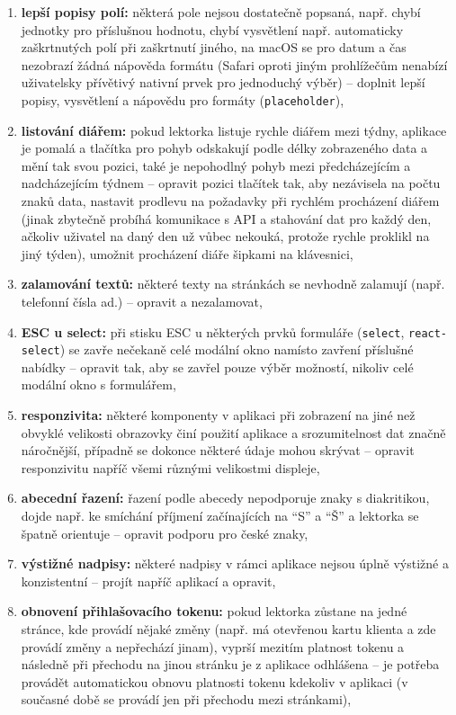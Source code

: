 \begin{enumerate}[label=\textbf{P\arabic*}]
    \item \label{P12} \textbf{lepší popisy polí:} některá pole nejsou dostatečně popsaná, např. chybí jednotky pro příslušnou hodnotu, chybí vysvětlení např. automaticky zaškrtnutých polí při zaškrtnutí jiného, na macOS se pro datum a čas nezobrazí žádná nápověda formátu (Safari oproti jiným prohlížečům nenabízí uživatelsky přívětivý nativní prvek pro jednoduchý výběr) -- doplnit lepší popisy, vysvětlení a nápovědu pro formáty (\verb|placeholder|),
    \item \label{P13} \textbf{listování diářem:} pokud lektorka listuje rychle diářem mezi týdny, aplikace je pomalá a tlačítka pro pohyb odskakují podle délky zobrazeného data a mění tak svou pozici, také je nepohodlný pohyb mezi předcházejícím a nadcházejícím týdnem -- opravit pozici tlačítek tak, aby nezávisela na počtu znaků data, nastavit prodlevu na požadavky při rychlém procházení diářem (jinak zbytečně probíhá komunikace s API a stahování dat pro každý den, ačkoliv uživatel na daný den už vůbec nekouká, protože rychle proklikl na jiný týden), umožnit procházení diáře šipkami na klávesnici,
    \item \label{P14} \textbf{zalamování textů:} některé texty na stránkách se nevhodně zalamují (např. telefonní čísla ad.) -- opravit a nezalamovat,
    \item \label{P15} \textbf{ESC u select:} při stisku ESC u některých prvků formuláře (\verb|select|, \verb|react-select|) se zavře nečekaně celé modální okno namísto zavření příslušné nabídky -- opravit tak, aby se zavřel pouze výběr možností, nikoliv celé modální okno s formulářem,
    \item \label{P16} \textbf{responzivita:} některé komponenty v aplikaci při zobrazení na jiné než obvyklé velikosti obrazovky činí použití aplikace a srozumitelnost dat značně náročnější, případně se dokonce některé údaje mohou skrývat -- opravit responzivitu napříč všemi různými velikostmi displeje,
    \item \label{P17} \textbf{abecední řazení:} řazení podle abecedy nepodporuje znaky s diakritikou, dojde např. ke smíchání příjmení začínajících na \enquote{S} a \enquote{Š} a lektorka se špatně orientuje -- opravit podporu pro české znaky,
    \item \label{P18} \textbf{výstižné nadpisy:} některé nadpisy v rámci aplikace nejsou úplně výstižné a konzistentní -- projít napříč aplikací a opravit,
    \item \label{P19} \textbf{obnovení přihlašovacího tokenu:} pokud lektorka zůstane na jedné stránce, kde provádí nějaké změny (např. má otevřenou kartu klienta a zde provádí změny a nepřechází jinam), vyprší mezitím platnost tokenu a následně při přechodu na jinou stránku je z aplikace odhlášena -- je potřeba provádět automatickou obnovu platnosti tokenu kdekoliv v aplikaci (v současné době se provádí jen při přechodu mezi stránkami),

\end{enumerate}
